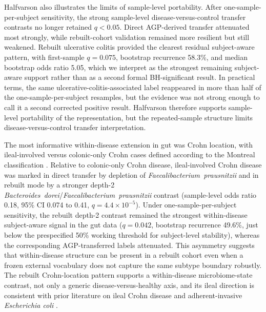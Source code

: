 \documentclass[11pt]{article}
\newcommand{\taxon}[1]{\emph{#1}}
\newcommand{\dcstsep}{/\allowbreak}
\begin{document}
Halfvarson also illustrates the limits of sample-level portability. After
one-sample-per-subject sensitivity, the strong sample-level
disease-versus-control transfer contrasts no longer retained $q < 0.05$. Direct
AGP-derived transfer attenuated most strongly, while rebuilt-cohort validation
remained more resilient but still weakened. Rebuilt ulcerative colitis provided
the clearest residual subject-aware pattern, with first-sample
$q = 0.075$, bootstrap recurrence 58.3\%, and median bootstrap odds ratio 5.05,
which we interpret as the strongest remaining subject-aware support rather than
as a second formal BH-significant result. In practical terms, the same
ulcerative-colitis-associated label reappeared in more than half of the
one-sample-per-subject resamples, but the evidence was not strong enough to call
it a second corrected positive result. Halfvarson therefore supports sample-level
portability of the representation, but the repeated-sample structure limits
disease-versus-control transfer interpretation.

The most informative within-disease extension in gut was Crohn location, with
ileal-involved versus colonic-only Crohn cases defined according to the
Montreal classification \cite{Satsangi2006_Montreal}.
Relative to colonic-only Crohn disease, ileal-involved Crohn disease was marked
in direct transfer by depletion of \taxon{Faecalibacterium~prausnitzii} and in
rebuilt mode by a stronger depth-2
\taxon{Bacteroides~dorei}\dcstsep\taxon{Faecalibacterium~prausnitzii} contrast
(sample-level odds ratio 0.18, 95\% CI 0.074 to 0.41, $q = 4.4 \times 10^{-5}$).
Under one-sample-per-subject sensitivity, the rebuilt depth-2 contrast remained
the strongest within-disease subject-aware signal in the gut data
($q = 0.042$, bootstrap recurrence 49.6\%, just below the prespecified
50\% working threshold for subject-level stability),
whereas the corresponding AGP-transferred labels attenuated. This asymmetry suggests that
within-disease structure can be present in a rebuilt cohort even
when a frozen external vocabulary does not capture the same subtype boundary
robustly. The rebuilt Crohn-location pattern supports a within-disease
microbiome-state contrast, not only a generic disease-versus-healthy axis, and
its ileal direction is consistent with prior literature on ileal Crohn
disease and adherent-invasive \textit{Escherichia coli}
\cite{DarfeuilleMichaud2004_AIEC_ileal_CD}.
\end{document}
